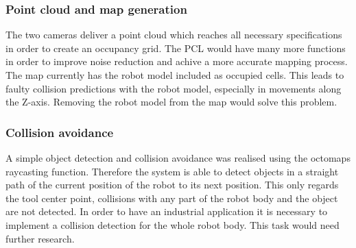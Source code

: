 \subsubsection{Point cloud and map generation}
The two cameras deliver a point cloud which reaches all necessary specifications in order to create an occupancy grid. The PCL would have many more functions in order to improve noise reduction and achive a more accurate mapping process. The map currently has the robot model included as occupied cells. This leads to faulty collision predictions with the robot model, especially in movements along the Z-axis. Removing the robot model from the map would solve this problem.

\subsubsection{Collision avoidance}
A simple object detection and collision avoidance was realised using the octomaps raycasting function. Therefore the system is able to detect objects in a straight path of the current position of the robot to its next position. This only regards the tool center point, collisions with any part of the robot body and the object are not detected. In order to have an industrial application it is necessary to implement a collision detection for the whole robot body. This task would need further research.